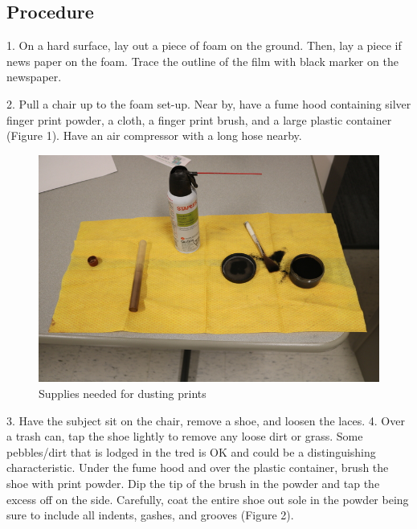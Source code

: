 \subsection{Procedure}

1.	On a hard surface, lay out a piece of foam on the ground. Then, lay a piece if news paper on the foam. Trace the outline of the film with black marker on the newspaper.

2. Pull a chair up to the foam set-up. Near by, have a fume hood containing silver finger print powder, a cloth, a finger print brush, and a large plastic container (Figure 1). Have an air compressor with a long hose nearby.  

\begin{figure}[!htp]
\centering
\includegraphics[scale=0.3]{Powder_Stuff}
\caption{Supplies needed for dusting prints}
\label{Figure 1}
\end{figure}

3.	Have the subject sit on the chair, remove a shoe, and loosen the laces.  
4.	Over a trash can, tap the shoe lightly to remove any loose dirt or grass. Some pebbles/dirt that is lodged in the tred is OK and could be a distinguishing characteristic. Under the fume hood and over the plastic container, brush the shoe with print powder. Dip the tip of the brush in the powder and tap the excess off on the side. Carefully, coat the entire shoe out sole in the powder being sure to include all indents, gashes, and grooves (Figure 2). 

